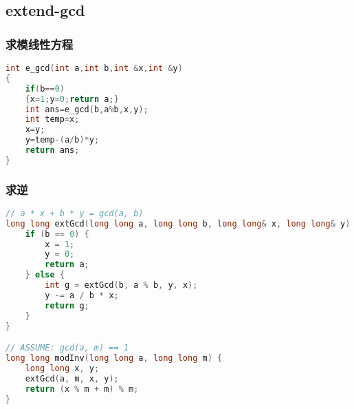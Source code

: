 \subsection{extend-gcd}
	\subsubsection{求模线性方程}
		\begin{lstlisting}[language=c++]
int e_gcd(int a,int b,int &x,int &y)
{
	if(b==0)
	{x=1;y=0;return a;}
	int ans=e_gcd(b,a%b,x,y);
	int temp=x;
	x=y;
	y=temp-(a/b)*y;
	return ans;
}
	\end{lstlisting}
	
	\subsubsection{求逆}
		\begin{lstlisting}[language=c++]
// a * x + b * y = gcd(a, b)
long long extGcd(long long a, long long b, long long& x, long long& y) {
	if (b == 0) {
		x = 1;
		y = 0;
		return a;
	} else {
		int g = extGcd(b, a % b, y, x);
		y -= a / b * x;
		return g;
	}
}

// ASSUME: gcd(a, m) == 1
long long modInv(long long a, long long m) {
	long long x, y;
	extGcd(a, m, x, y);
	return (x % m + m) % m;
}
	\end{lstlisting}